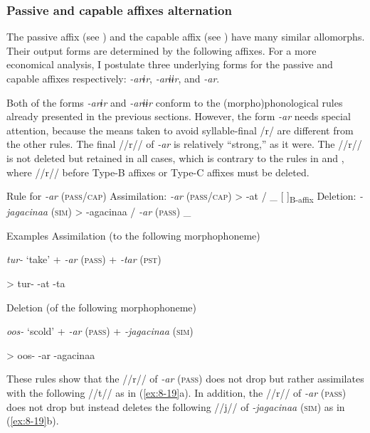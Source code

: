 \subsubsection{Passive and capable affixes alternation}

The passive affix (see ) and the capable affix (see ) have many similar allomorphs. Their output forms are determined by the following affixes. For a more economical analysis, I postulate three underlying forms for the passive and capable affixes respectively: \textit{-arɨr}, \textit{-arɨɨr}, and \textit{-ar}.

Both of the forms \textit{-arɨr} and \textit{-arɨɨr} conform to the (morpho)phonological rules already presented in the previous sections. However, the form \textit{-ar} needs special attention, because the means taken to avoid syllable-final /r/ are different from the other rules. The final //r// of \textit{-ar} is relatively “strong,” as it were. The //r// is not deleted but retained in all cases, which is contrary to the rules in  and , where //r// before Type-B affixes or Type-C affixes must be deleted.

\ea\label{ex:8-18}
  Rule for \textit{-ar} (\textsc{pass}/\textsc{cap})
    \ea Assimilation:  \textit{-ar} (\textsc{pass}/\textsc{cap})  >  -at  /  \_  [  ]\textsubscript{B-affix}
    \ex Deletion:  \textit{-jagacinaa} (\textsc{sim})  >  -agacinaa  /  \textit{-ar} (\textsc{pass})  \_
    \z
\z

\ea\label{ex:8-19}
  Examples
    \ea Assimilation (to the following morphophoneme)

        \textit{tur-}  ‘take’  +  \textit{-ar} (\textsc{pass})  +  \textit{-tar} (\textsc{pst})

        >  tur-      -at      -ta


    \ex Deletion (of the following morphophoneme)

        \textit{oos-}  ‘scold’  +  \textit{-ar} (\textsc{pass})  +  \textit{-jagacinaa} (\textsc{sim})

        >  oos-      -ar      -agacinaa
    \z
\z

These rules show that the //r// of \textit{-ar} (\textsc{pass}) does not drop but rather assimilates with the following //t// as in (\ref{ex:8-19}a). In addition, the //r// of \textit{-ar} (\textsc{pass}) does not drop but instead deletes the following //j// of \textit{-jagacinaa} (\textsc{sim}) as in (\ref{ex:8-19}b).

